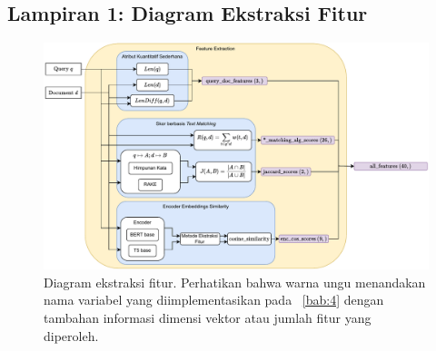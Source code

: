 \begin{landscape}
\chapter*{Lampiran 1: Diagram Ekstraksi Fitur}
\label{Lampiran 1: Diagram Ekstraksi Fitur}
\begin{figure}
    \centering
    \includegraphics[scale=0.75]{assets/pdfs/ekstraksiFitur.pdf}
    \caption{Diagram ekstraksi fitur. Perhatikan bahwa warna ungu menandakan nama variabel yang diimplementasikan pada \bab{}~\ref{bab:4} dengan tambahan informasi dimensi vektor atau jumlah fitur yang diperoleh.}
    \label{fig:diagramEkstraksiFitur}
\end{figure}
\end{landscape}


